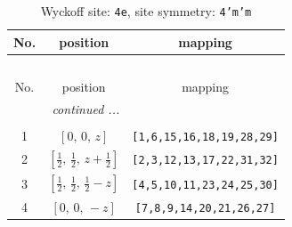 \documentclass[fleqn,8pt]{jsarticle}
\begin{document}
\renewcommand{\arraystretch}{1.2}
\begin{longtable}{ccc}
\caption{Wyckoff site: {\tt 4e}, site symmetry: {\tt 4'm'm}}
 \\
 \hline \hline
No. & position & mapping \\ \hline \endfirsthead

\multicolumn{2}{l}{\tablename\ \thetable{}} \\
 \hline \hline
No. & position & mapping \\ \hline \endhead

 \hline \hline
\multicolumn{2}{r}{\footnotesize\it continued ...} \\ \endfoot

 \hline \hline
\multicolumn{2}{r}{} \\ \endlastfoot

1 & $\left[ 0,\, 0,\, z \right]$ & {\tt [1,6,15,16,18,19,28,29]} \\ \hline
2 & $\left[ \frac{1}{2},\, \frac{1}{2},\, z + \frac{1}{2} \right]$ & {\tt [2,3,12,13,17,22,31,32]} \\ \hline
3 & $\left[ \frac{1}{2},\, \frac{1}{2},\, \frac{1}{2} - z \right]$ & {\tt [4,5,10,11,23,24,25,30]} \\ \hline
4 & $\left[ 0,\, 0,\, - z \right]$ & {\tt [7,8,9,14,20,21,26,27]} \\
\end{longtable}
\renewcommand{\arraystretch}{1.2}
\end{document}
